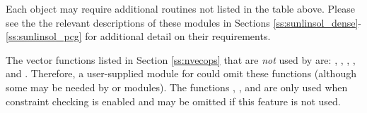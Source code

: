 Each {\sunlinsol} object may require additional {\nvector} routines
not listed in the table above.  Please see the the relevant
descriptions of these modules in Sections
\ref{ss:sunlinsol_dense}-\ref{ss:sunlinsol_pcg} for additional detail
on their {\nvector} requirements.

The vector functions listed in Section \ref{ss:nvecops} that are {\em not} used by
{\cvode} are: , , , ,
and . Therefore, a user-supplied
{\nvector} module for {\cvode} could omit these functions (although
some may be needed by {\sunnonlinsol} or {\sunlinsol} modules). The functions
, , and  are only used
when constraint checking is enabled and may be omitted if this feature is not used.

















